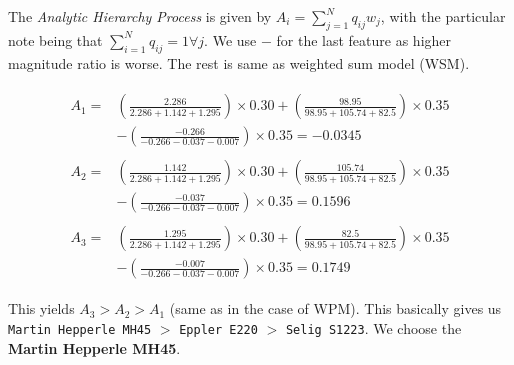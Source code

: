 The \emph{Analytic Hierarchy Process} is given by $A_i = \sum_{j=1}^{N} q_{ij} w_j$, with the particular note being that $\sum_{i=1}^{N} q_{ij} = 1 \forall j$. We use $-$ for the last feature as higher magnitude ratio is worse. The rest is same as weighted sum model (WSM).

\begin{align*}
    \begin{split}
        A_1 = &\left ( \frac{2.286}{2.286+1.142+1.295} \right ) \times 0.30 + \left ( \frac{98.95}{98.95+105.74+82.5} \right ) \times 0.35 \\
            &- \left ( \frac{-0.266}{-0.266-0.037-0.007} \right ) \times 0.35 = -0.0345
    \end{split} \\
    \begin{split}
        A_2 = &\left ( \frac{1.142}{2.286+1.142+1.295} \right ) \times 0.30 + \left ( \frac{105.74}{98.95+105.74+82.5} \right ) \times 0.35 \\
            &- \left ( \frac{-0.037}{-0.266-0.037-0.007} \right ) \times 0.35 = 0.1596
    \end{split} \\
    \begin{split}
        A_3 = &\left ( \frac{1.295}{2.286+1.142+1.295} \right ) \times 0.30 + \left ( \frac{82.5}{98.95+105.74+82.5} \right ) \times 0.35 \\
            &- \left ( \frac{-0.007}{-0.266-0.037-0.007} \right ) \times 0.35 = 0.1749
    \end{split}
\end{align*}

This yields $A_3 > A_2 > A_1$ (same as in the case of WPM). This basically gives us  \texttt{Martin Hepperle MH45} $>$ \texttt{Eppler E220} $>$ \texttt{Selig S1223}. We choose the \textbf{Martin Hepperle MH45}.
